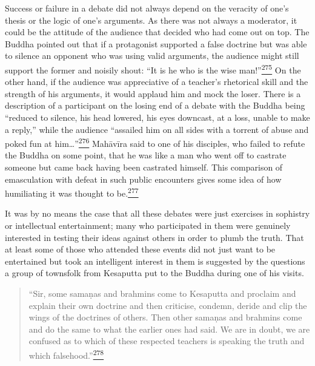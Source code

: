 Success or failure in a debate did not always depend on the veracity of
one's thesis or the logic of one's arguments. As there was not always a
moderator, it could be the attitude of the audience that decided who had
come out on top. The Buddha pointed out that if a protagonist supported
a false doctrine but was able to silence an opponent who was using valid
arguments, the audience might still support the former and noisily
shout: ``It is he who is the wise
man!''\label{footprints_split_010.html_fnref275}\hyperref[footprints_split_024.htmlux5cux23fn275]{\textsuperscript{275}}
On the other hand, if the audience was appreciative of a teacher's
rhetorical skill and the strength of his arguments, it would applaud him
and mock the loser. There is a description of a participant on the
losing end of a debate with the Buddha being ``reduced to silence, his
head lowered, his eyes downcast, at a loss, unable to make a reply,''
while the audience ``assailed him on all sides with a torrent of abuse
and poked fun at
him\ldots''\label{footprints_split_010.html_fnref276}\hyperref[footprints_split_024.htmlux5cux23fn276]{\textsuperscript{276}}
Mahāvīra said to one of his disciples, who failed to refute the Buddha
on some point, that he was like a man who went off to castrate someone
but came back having been castrated himself. This comparison of
emasculation with defeat in such public encounters gives some idea of
how humiliating it was thought to
be.\label{footprints_split_010.html_fnref277}\hyperref[footprints_split_024.htmlux5cux23fn277]{\textsuperscript{277}}

It was by no means the case that all these debates were just exercises
in sophistry or intellectual entertainment; many who participated in
them were genuinely interested in testing their ideas against others in
order to plumb the truth. That at least some of those who attended these
events did not just want to be entertained but took an intelligent
interest in them is suggested by the questions a group of townsfolk from
Kesaputta put to the Buddha during one of his visits.

\begin{quote}
``Sir, some samaṇas and brahmins come to Kesaputta and proclaim and
explain their own doctrine and then criticise, condemn, deride and clip
the wings of the doctrines of others. Then other samaṇas and brahmins
come and do the same to what the earlier ones had said. We are in doubt,
we are confused as to which of these respected teachers is speaking the
truth and which
falsehood.''\label{footprints_split_010.html_fnref278}\hyperref[footprints_split_024.htmlux5cux23fn278]{\textsuperscript{278}}
\end{quote}


